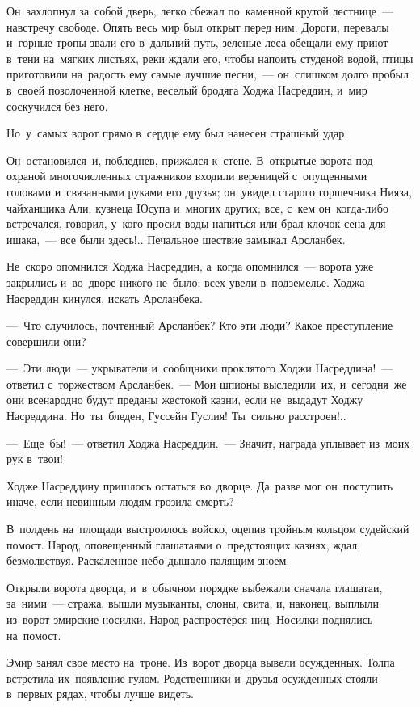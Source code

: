 \documentclass[12pt,a4paper]{book}
\begin{document}
Он~захлопнул за~собой дверь, легко сбежал по~каменной крутой лестнице~— навстречу свободе. Опять весь мир был открыт перед ним. Дороги, перевалы и~горные тропы звали его в~дальний путь, зеленые леса обещали ему приют в~тени на~мягких листьях, реки ждали его, чтобы напоить студеной водой, птицы приготовили на~радость ему самые лучшие песни,~— он~слишком долго пробыл в~своей позолоченной клетке, веселый бродяга Ходжа Насреддин, и~мир соскучился без него.

Но~у~самых ворот прямо в~сердце ему был нанесен страшный удар.

Он~остановился~и, побледнев, прижался к~стене. В~открытые ворота под охраной многочисленных стражников входили вереницей с~опущенными головами и~связанными руками его друзья; он~увидел старого горшечника Нияза, чайханщика Али, кузнеца Юсупа и~многих других; все, с~кем он~когда-либо встречался, говорил, у~кого просил воды напиться или брал клочок сена для ишака,~— все были здесь!.. Печальное шествие замыкал Арсланбек.

Не~скоро опомнился Ходжа Насреддин, а~когда опомнился~— ворота уже закрылись и~во~дворе никого не~было: всех увели в~подземелье. Ходжа Насреддин кинулся, искать Арсланбека.

—~Что случилось, почтенный Арсланбек? Кто эти люди? Какое преступление совершили они?

—~Эти люди~— укрыватели и~сообщники проклятого Ходжи Насреддина!~— ответил с~торжеством Арсланбек.~— Мои шпионы выследили~их, и~сегодня~же они всенародно будут преданы жестокой казни, если не~выдадут Ходжу Насреддина. Но~ты~бледен, Гуссейн Гуслия! Ты~сильно расстроен!..

—~Еще~бы!~— ответил Ходжа Насреддин.~— Значит, награда уплывает из~моих рук в~твои!

Ходже Насреддину пришлось остаться во~дворце. Да~разве мог он~поступить иначе, если невинным людям грозила смерть?

В~полдень на~площади выстроилось войско, оцепив тройным кольцом судейский помост. Народ, оповещенный глашатаями о~предстоящих казнях, ждал, безмолвствуя. Раскаленное небо дышало палящим зноем.

Открыли ворота дворца, и~в~обычном порядке выбежали сначала глашатаи, за~ними~— стража, вышли музыканты, слоны, свита, и, наконец, выплыли из~ворот эмирские носилки. Народ распростерся ниц. Носилки поднялись на~помост.

Эмир занял свое место на~троне. Из~ворот дворца вывели осужденных. Толпа встретила их~появление гулом. Родственники и~друзья осужденных стояли в~первых рядах, чтобы лучше видеть.
\end{document}
